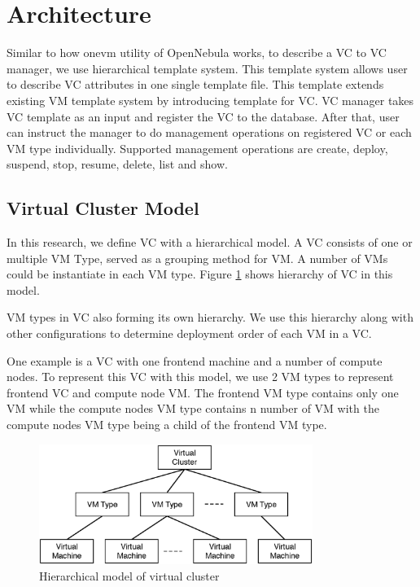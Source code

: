 \documentclass[conference]{IEEEtran}
\begin{document}
\section{Architecture}
Similar to how onevm utility of OpenNebula works, to describe a VC to VC manager, we use hierarchical template system.
This template system allows user to describe VC attributes in one single template file.
This template extends existing VM template system by introducing template for VC.
VC manager takes VC template as an input and register the VC to the database.
After that, user can instruct the manager to do management operations on registered VC or each VM type individually.
Supported management operations are create, deploy, suspend, stop, resume, delete, list and show.

\subsection{Virtual Cluster Model}
In this research, we define VC with a hierarchical model.
A VC consists of one or multiple VM Type, served as a grouping method for VM.
A number of VMs could be instantiate in each VM type.
Figure \ref{fig:model} shows hierarchy of VC in this model.

VM types in VC also forming its own hierarchy.
We use this hierarchy along with other configurations to determine deployment order of each VM in a VC.

One example is a VC with one frontend machine and a number of compute nodes.
To represent this VC with this model, we use 2 VM types to represent frontend VC and compute node VM.
The frontend VM type contains only one VM while the compute nodes VM type contains n number of VM with the compute nodes VM type being a child of the frontend VM type.

\begin{figure}[!t]
\centering
\includegraphics[width=3.5in]{model}
\caption{Hierarchical model of virtual cluster}
\label{fig:model}
\end{figure}
\end{document}
